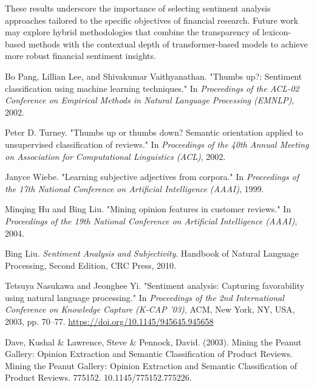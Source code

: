 \documentclass[12pt]{article}
\begin{document}
These results underscore the importance of selecting sentiment analysis approaches tailored to the specific objectives of financial research. Future work may explore hybrid methodologies that combine the transparency of lexicon-based methods with the contextual depth of transformer-based models to achieve more robust financial sentiment insights.

\begin{thebibliography}{}

Bo Pang, Lillian Lee, and Shivakumar Vaithyanathan. "Thumbs up?: Sentiment classification using machine learning techniques." In \textit{Proceedings of the ACL-02 Conference on Empirical Methods in Natural Language Processing (EMNLP)}, 2002.

Peter D. Turney. "Thumbs up or thumbs down? Semantic orientation applied to unsupervised classification of reviews." In \textit{Proceedings of the 40th Annual Meeting on Association for Computational Linguistics (ACL)}, 2002.

Janyce Wiebe. "Learning subjective adjectives from corpora." In \textit{Proceedings of the 17th National Conference on Artificial Intelligence (AAAI)}, 1999.

Minqing Hu and Bing Liu. "Mining opinion features in customer reviews." In \textit{Proceedings of the 19th National Conference on Artificial Intelligence (AAAI)}, 2004.

Bing Liu. \textit{Sentiment Analysis and Subjectivity}. Handbook of Natural Language Processing, Second Edition, CRC Press, 2010.

Tetsuya Nasukawa and Jeonghee Yi. "Sentiment analysis: Capturing favorability using natural language processing." In \textit{Proceedings of the 2nd International Conference on Knowledge Capture (K-CAP '03)}, ACM, New York, NY, USA, 2003, pp. 70–77. \url{https://doi.org/10.1145/945645.945658}

Dave, Kushal \& Lawrence, Steve \& Pennock, David. (2003). Mining the Peanut Gallery: Opinion Extraction and Semantic Classification of Product Reviews. Mining the Peanut Gallery: Opinion Extraction and Semantic Classification of Product Reviews. 775152. 10.1145/775152.775226. 


\end{thebibliography}
\end{document}
